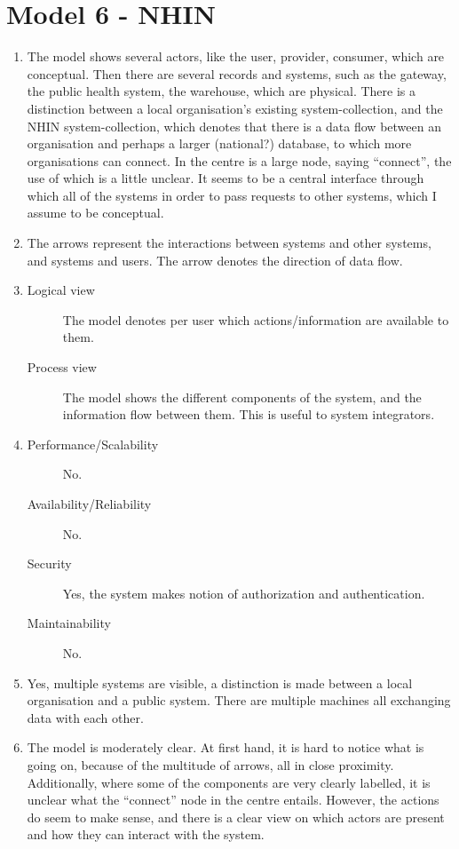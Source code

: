 \section{Model 6 - NHIN}
\begin{enumerate}
	\item The model shows several actors, like the user, provider, consumer, which are conceptual. 
	Then there are several records and systems, such as the gateway, the public health system, the warehouse, which are physical.
	There is a distinction between a local organisation's existing system-collection, and the NHIN system-collection, which denotes that there is a data flow between an organisation and perhaps a larger (national?) database, to which more organisations can connect.
	In the centre is a large node, saying ``connect'', the use of which is a little unclear. 
	It seems to be a central interface through which all of the systems in order to pass requests to other systems, which I assume to be conceptual.
	
	\item The arrows represent the interactions between systems and other systems, and systems and users.
	The arrow denotes the direction of data flow.
	
	\item
	\begin{description}
		\item[Logical view] The model denotes per user which actions/information are available to them.
		\item[Process view] The model shows the different components of the system, and the information flow between them. This is useful to system integrators.
	\end{description}
	
	\item
	\begin{description}
		\item[Performance/Scalability] No.
		\item[Availability/Reliability] No.
		\item[Security] Yes, the system makes notion of authorization and authentication.
		\item[Maintainability] No.
	\end{description}
	
	\item Yes, multiple systems are visible, a distinction is made between a local organisation and a public system. 
	There are multiple machines all exchanging data with each other.
	
	\item The model is moderately clear. At first hand, it is hard to notice what is going on, because of the multitude of arrows, all in close proximity.
	Additionally, where some of the components are very clearly labelled, it is unclear what the ``connect'' node in the centre entails.
	However, the actions do seem to make sense, and there is a clear view on which actors are present and how they can interact with the system.
\end{enumerate}
